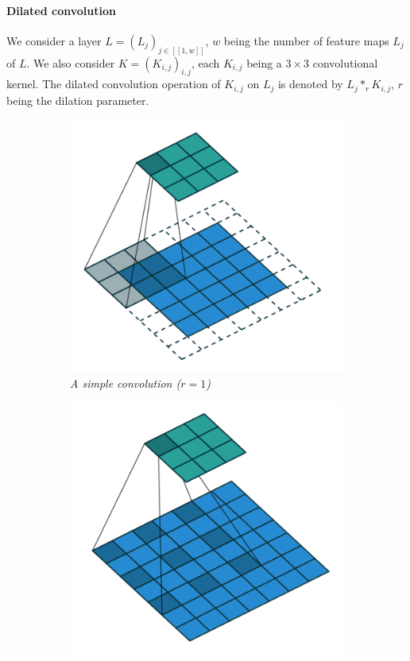 \documentclass{article}
\begin{document}
            \paragraph{Dilated convolution}\label{par:dilated} We consider a layer $L=(L_j)_{j\in [\![1,w]\!]}$, $w$ being the number of feature maps $L_j$ of $L$. We also consider $K=(K_{i,j})_{i,j}$, each $K_{i,j}$ being a $3\times 3$ convolutional kernel. The dilated convolution operation of $K_{i,j}$ on $L_j$ is denoted by $L_j*_r K_{i,j}$, $r$ being the dilation parameter.

            \begin{figure}[!ht]
                \begin{subfigure}{.49\linewidth}
                    \centering
                    \includegraphics[width=.8\linewidth]{pics/conv-simple.png}
                    \caption{\textit{A simple convolution ($r=1$)}}
                    \label{fig:conv-simple}
                \end{subfigure}
                \begin{subfigure}{.49\linewidth}
                    \centering
                    \includegraphics[width=.8\linewidth]{pics/conv-dilated.png}

\end{subfigure}
\end{figure}
\end{document}
